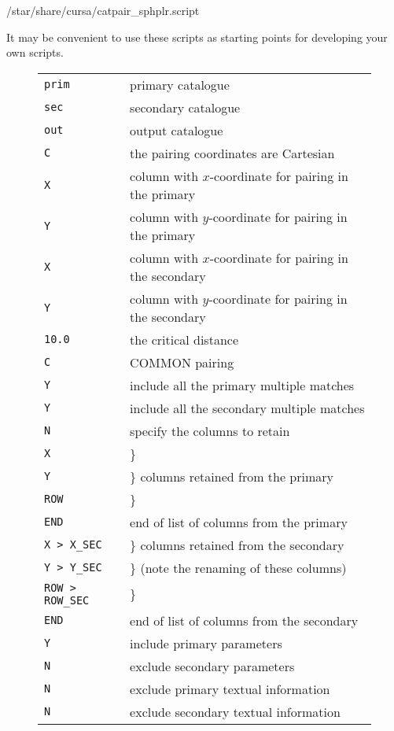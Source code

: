 \documentclass[twoside,11pt]{starlink}
\begin{document}
\begin{terminalv}
/star/share/cursa/catpair_sphplr.script
\end{terminalv}

It may be convenient to use these scripts as starting points for
developing your own scripts.

\begin{figure}[htbp]

\begin{center}
\begin{tabular}{ll}
\texttt{prim}        & primary catalogue \\
\texttt{sec}         & secondary catalogue \\
\texttt{out}         & output catalogue \\
\texttt{C}           & the pairing coordinates are Cartesian \\
\texttt{X}           & column with $x$-coordinate for pairing in the primary \\
\texttt{Y}           & column with $y$-coordinate for pairing in the primary \\
\texttt{X}           & column with $x$-coordinate for pairing in the secondary \\
\texttt{Y}           & column with $y$-coordinate for pairing in the secondary \\
\texttt{10.0}        & the critical distance \\
\texttt{C}           & COMMON pairing \\
\texttt{Y}           & include all the primary multiple matches \\
\texttt{Y}           & include all the secondary multiple matches \\
\texttt{N}           & specify the columns to retain \\
\texttt{X}           & \} \\
\texttt{Y}           & \} columns retained from the primary \\
\texttt{ROW}         & \}  \\
\texttt{END}         & end of list of columns from the primary  \\
\texttt{X > X\_SEC}  & \} columns retained from the secondary \\
\texttt{Y > Y\_SEC}  & \} (note the renaming of these columns) \\
\texttt{ROW > ROW\_SEC}    & \}   \\
\texttt{END}         & end of list of columns from the secondary   \\
\texttt{Y}           & include primary parameters \\
\texttt{N}           & exclude secondary parameters \\
\texttt{N}           & exclude primary textual information \\
\texttt{N}           & exclude secondary textual information \\
\end{tabular}
\end{center}


\end{figure}
\end{document}
